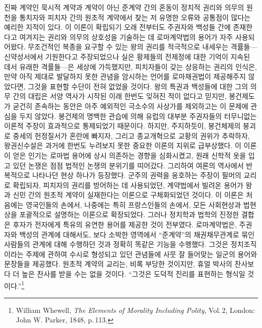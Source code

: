 진짜 계약인 묵시적 계약과 계약이 아닌 준계약 간의 혼동이
정치적 권리와 의무의 원천을
통치자와 피치자 간의 원초적 계약에서
찾는
저 유명한 오류와 공통점이 많다는 예리한 지적이 있다.
이 이론이 확립되기 오래 전부터도
주권자와 백성들 간에 존재한다고 여겨지는
권리와 의무의 상호성을 기술하는 데
로마계약법의 용어가 자주 사용되어왔다.
무조건적인 복종을 요구할 수 있는 왕의 권리를 적극적으로 내세우는
격률들---신약성서에서 기원한다고 주장되었으나 실은
황제들의 전제정에 대한 기억이 지속된 데서 유래한 격률들---은
세상에 가득했지만,
피치자들이 갖는 상응하는 권리의 인식은,
만약
아직 제대로 발달하지 못한 관념을 암시하는 언어를
로마채권법이
제공해주지 않았다면,
그것을 표현할 수단이 전혀 없었을 것이다.
왕의 특권과 백성들에 대한 그의 의무 간의 대립은
서양 역사가 시작된 이래 한번도 잊혀진 적이 없다고 믿지만,
봉건제도가 굳건히 존속하는 동안은
아주 예외적인 극소수의 사상가를 제외하고는
이 문제에 관심을 두지 않았다.
봉건제의 명백한 관습에 의해
유럽의 대부분 주권자들의 터무니없는 이론적 주장이
효과적으로 통제되었기 때문이다.
하지만,
주지하듯이,
봉건체제의 붕괴로 중세의 헌정질서가 혼란에 빠지자,
그리고
종교개혁으로 교황의 권위가 추락하자,
왕권신수설은
과거에 한번도 누려보지 못한
중요한 이론의 지위로
급부상했다.
이 이론이 얻은 인기는
로마법 용어에 상시 의존하는 경향을 심화시켰고,
원래 신학적 옷을 입고 있던 논쟁은
점점
법적인 논쟁의 분위기를 띠어갔다.
그리하여 여론의 역사에서 반복적으로 나타나던 현상 하나가 등장했다.
군주의 권력을 옹호하는 주장이 필머의 교리로
확립되자,
피치자의 권리를 방어하는 데 사용되었던,
계약법에서 빌려온
용어가
왕과 신민 간의 원초적 계약이 실재한다는 이론으로
구체화되었던 것이다.
이 이론은 처음에는 영국인들의 손에서,
나중에는 특히 프랑스인들의 손에서,
모든 사회현상과 법현상을 포괄적으로 설명하는 이론으로 확장되었다.
그러나
정치학과 법학의 진정한 결합은
후자가 전자에게
특유의 유연한 용어를 제공한 것이 전부였다.
로마계약법은,
주권자와 백성의 관계에 대해서도,
보다 소박한 영역에서
``준계약''의 채권채무관계로 묶인 사람들의 관계에 대해 수행하던 것과
정확히 똑같은 기능을 수행했다.
그것은
정치조직이라는 주제에 관하여 수시로 형성되고 있던 관념들에
사뭇 잘 들어맞는
일군의 용어와 문장들을 제공했다.
원초적 계약의 교리는,
비록 부당한 것이지만,
휴얼 박사의
찬사보다 더 높은 찬사를 받을 수는 없을 것이다.
``그것은 도덕적 진리를 표현하는  형식일 것이다.''\footnote{%
  \latinmarks
  William Whewell,
  \textit{The Elements of Morality Including Polity},
  Vol.\,2,
  London: John W. Parker, 1848,
  p.\,113.
  }

